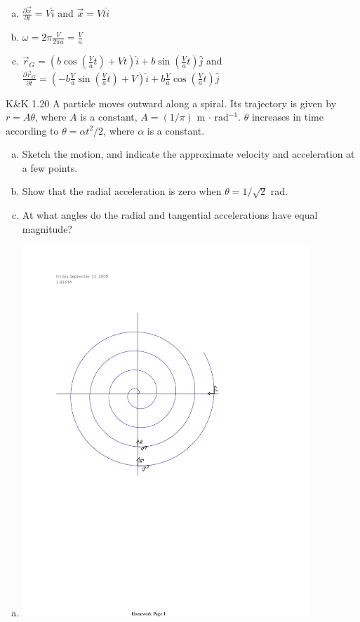 \documentclass{esg8012pset}
\begin{document}
\begin{question}[Problem 2]
\begin{solution}
\begin{enumerate}[a)]
    \item $\frac{\partial \vec x}{\partial t} = V\hat i$ and $\vec x = V t\hat i$
    \item $\omega = 2\pi \frac{V}{2\pi a} = \frac{V}{a}$
    \item $\vec r_G = \left(b\cos\left(\frac{V}{a}t\right) + Vt\right)\hat i + b\sin\left(\frac{V}{a}t\right)\hat j$ and $\frac{\partial \vec r_G}{\partial t} = \left(-b\frac{V}{a}\sin\left(\frac{V}{a}t\right) + V\right)\hat i + b\frac{V}{a}\cos\left(\frac{V}{a}t\right)\hat j$
  \end{enumerate}
\end{solution}

\begin{problem}{K\&K 1.20}
  A particle moves outward along a spiral. Its trajectory is given by
  $r = A\theta$, where $A$ is a constant, $A = (1/\pi )$ m $\cdot$ rad$^{-1}$.  $\theta$ increases in time according to $\theta =\alpha t^2 / 2$, where $\alpha$ is a constant.
  \begin{enumerate}[a.]
    \item Sketch the motion, and indicate the approximate velocity and acceleration at a few
  points.
    \item Show that the radial acceleration is zero when $\theta =1/\sqrt{2}$ rad.
    \item At what angles do the radial and tangential accelerations have equal magnitude?
  \end{enumerate}
\end{problem}
\begin{solution}
  \begin{enumerate}[a.]
    \item \includegraphics[width=0.85\textwidth]{ps01_Diagram_3}

\end{enumerate}
\end{solution}
\end{question}
\end{document}

